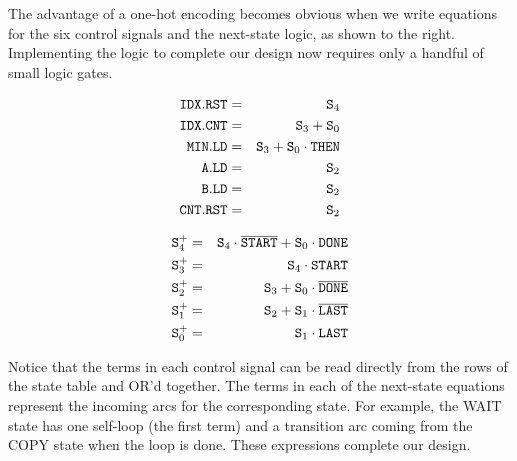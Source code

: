 \begin{minipage}{2.15in}
\vspace{8pt}
The advantage of a one-hot encoding becomes obvious when we write
equations for the six control signals and the next-state logic, as shown
to the right.  
%
Implementing the logic to complete our design now requires only a handful 
of small logic gates.
\end{minipage}\hspace{0.4in}%
\begin{minipage}{1.7in}
\begin{eqnarray*}
{\tt IDX.RST} & = & {\tt S}_4\\
{\tt IDX.CNT} & = & {\tt S}_3 + {\tt S}_0\\
{\tt MIN.LD} & = & {\tt S}_3 + {\tt S}_0 \cdot {\tt THEN}\\
{\tt A.LD} & = & {\tt S}_2\\
{\tt B.LD} & = & {\tt S}_2\\
{\tt CNT.RST} & = & {\tt S}_2
\end{eqnarray*}
\end{minipage}\hspace{0.4in}%
\begin{minipage}{1.85in}
\begin{eqnarray*}
{\tt S}_4^+ & = & {\tt S}_4 \cdot \overline{\tt START} + {\tt S}_0 \cdot {\tt DONE}\\
{\tt S}_3^+ & = & {\tt S}_4 \cdot {\tt START}\\
{\tt S}_2^+ & = & {\tt S}_3 + {\tt S}_0 \cdot \overline{\tt DONE}\\
{\tt S}_1^+ & = & {\tt S}_2 + {\tt S}_1 \cdot \overline{\tt LAST}\\
{\tt S}_0^+ & = & {\tt S}_1 \cdot {\tt LAST}\\
\end{eqnarray*}
\end{minipage}

Notice that the terms in each control signal can be read directly from 
the rows of the state table and OR'd together.  The terms in each of the
next-state equations represent the incoming arcs for the corresponding
state.  For example, the {\tfix WAIT} state has one self-loop (the first
term) and a transition arc coming from the {\tfix COPY} state when the
loop is done.
%
These expressions complete our design.

\vfill

\pagebreak

